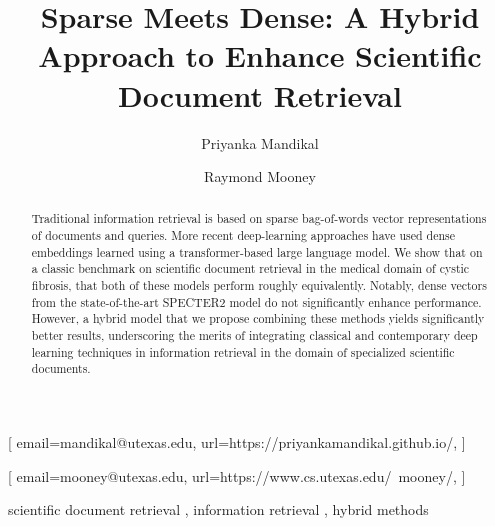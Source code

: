 \documentclass[
]{ceurart}
\begin{document}


\title{Sparse Meets Dense: A Hybrid Approach to Enhance Scientific Document Retrieval}


\author[]{Priyanka Mandikal}[%
email=mandikal@utexas.edu,
url=https://priyankamandikal.github.io/,
]
\address[]{The University of Texas at Austin, USA}

\author[]{Raymond Mooney}[%
email=mooney@utexas.edu,
url=https://www.cs.utexas.edu/~mooney/,
]



\begin{abstract}
Traditional information retrieval is based on sparse bag-of-words vector representations of documents and queries. More recent deep-learning approaches have used dense embeddings learned using a transformer-based large language model. We show that on a classic benchmark on scientific document retrieval in the medical domain of cystic fibrosis, that both of these models perform roughly equivalently. Notably, dense vectors from the state-of-the-art SPECTER2 model do not significantly enhance performance. However, a hybrid model that we propose combining these methods yields significantly better results, underscoring the merits of integrating classical and contemporary deep learning techniques in information retrieval in the domain of specialized scientific documents.
\end{abstract}

\begin{keywords}
  scientific document retrieval \sep
  information retrieval \sep
  hybrid methods
\end{keywords}
\end{document}
